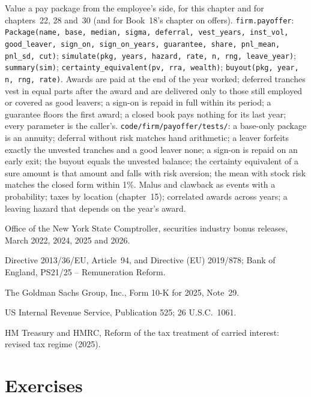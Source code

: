 \begin{build}
 Value a pay package from the employee's side, for this chapter and for chapters~22, 28 and~30 (and for
Book~18's chapter on offers).
 \texttt{firm.payoffer}: \texttt{Package(name, base, median, sigma, deferral, vest\_years, inst\_vol,
good\_leaver, sign\_on, sign\_on\_years, guarantee, share, pnl\_mean, pnl\_sd, cut)};
\texttt{simulate(pkg, years, hazard, rate, n, rng, leave\_year)}; \texttt{summary(sim)};
\texttt{certainty\_equivalent(pv, rra, wealth)}; \texttt{buyout(pkg, year, n, rng, rate)}.
 Awards are paid at the end of the year worked; deferred tranches vest in equal parts after the award and
are delivered only to those still employed or covered as good leavers; a sign-on is repaid in full within its period;
a guarantee floors the first award; a closed book pays nothing for its last year; every parameter is the caller's.
 \texttt{code/firm/payoffer/tests/}: a base-only package is an annuity; deferral without risk
matches hand arithmetic; a leaver forfeits exactly the unvested tranches and a good leaver none; a sign-on is repaid on
an early exit; the buyout equals the unvested balance; the certainty equivalent of a sure amount is that amount and falls
with risk aversion; the mean with stock risk matches the closed form within 1\%.
 Malus and clawback as events with a probability; taxes by location (chapter~15); correlated awards
across years; a leaving hazard that depends on the year's award.
\end{build}

\begin{omsources}
\item Office of the New York State Comptroller, securities industry bonus releases, March 2022, 2024, 2025 and 2026.
\item Directive 2013/36/EU, Article~94, and Directive (EU) 2019/878; Bank of England, PS21/25 -- Remuneration Reform.
\item The Goldman Sachs Group, Inc., Form 10-K for 2025, Note~29.
\item US Internal Revenue Service, Publication 525; 26 U.S.C.\ 1061.
\item HM Treasury and HMRC, Reform of the tax treatment of carried interest: revised tax regime (2025).
\end{omsources}

\section{Exercises}

